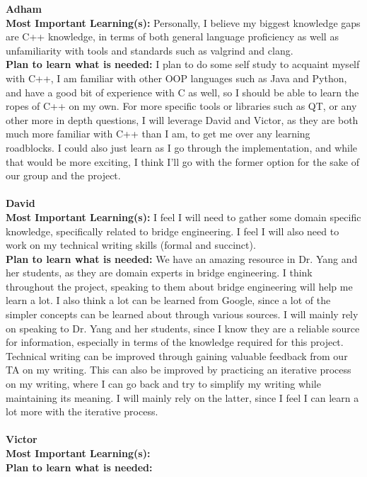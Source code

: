 \documentclass[12pt]{article}
\begin{document}
\noindent\textbf{Adham}\\
\textbf{Most Important Learning(s):} Personally, I believe my biggest knowledge gaps are C++ knowledge, in terms of both general language proficiency as well as unfamiliarity
with tools and standards such as valgrind and clang.\\
\textbf{Plan to learn what is needed:} I plan to do some self study to acquaint myself with C++, I am familiar with other OOP languages such as Java and Python, and have a good
bit of experience with C as well, so I should be able to learn the ropes of C++ on my own. For more specific tools or libraries such as QT, or any other more in depth questions,
I will leverage David and Victor, as they are both much more familiar with C++ than I am, to get me over any learning roadblocks. I could also just learn as I go through the
implementation, and while that would be more exciting, I think I'll go with the former option for the sake of our group and the project.\\\\

\noindent\textbf{David}\\
\textbf{Most Important Learning(s):} I feel I will need to gather some domain specific knowledge, specifically related to bridge engineering. 
I feel I will also need to work on my technical writing skills (formal and succinct). \\
\textbf{Plan to learn what is needed:} We have an amazing resource in Dr. Yang and her students, as they are domain experts in bridge engineering. I think throughout the 
project, speaking to them about bridge engineering will help me learn a lot. I also think a lot can be learned from Google, since a lot of the simpler concepts can be learned 
about through various sources. I will mainly rely on speaking to Dr. Yang and her students, since I know they are a reliable source for information, especially in terms of 
the knowledge required for this project. Technical writing can be improved through gaining valuable feedback from our TA on my writing. This can also be improved
by practicing an iterative process on my writing, where I can go back and try to simplify my writing while maintaining its meaning. I will mainly rely on the latter, since 
I feel I can learn a lot more with the iterative process.\\\\

\noindent\textbf{Victor}\\
\textbf{Most Important Learning(s):}\\
\textbf{Plan to learn what is needed:}\\\\
\end{document}
